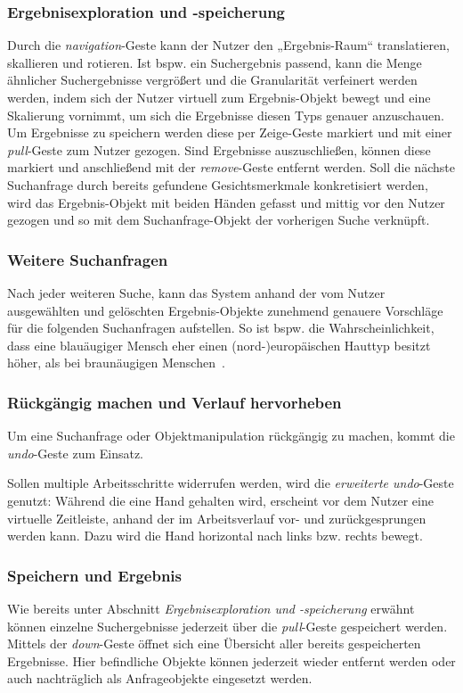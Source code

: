 \documentclass{sigchi-ext}
\begin{document}
\subsubsection{Ergebnisexploration und -speicherung}
Durch die \textit{navigation}-Geste kann der Nutzer den „Ergebnis-Raum“
translatieren, skallieren und rotieren. Ist bspw. ein Suchergebnis
passend, kann die Menge ähnlicher Suchergebnisse vergrößert und die
Granularität verfeinert werden werden, indem sich der Nutzer virtuell zum Ergebnis-Objekt bewegt und eine Skalierung vornimmt, um sich die Ergebnisse diesen Typs genauer anzuschauen.
Um Ergebnisse zu speichern werden diese per Zeige-Geste markiert und mit einer \textit{pull}-Geste zum Nutzer gezogen. Sind Ergebnisse auszuschließen, können diese markiert und anschließend mit der \textit{remove}-Geste entfernt werden.
Soll die nächste Suchanfrage durch bereits gefundene Gesichtsmerkmale konkretisiert werden, wird das Ergebnis-Objekt mit beiden Händen gefasst und mittig vor den Nutzer gezogen und so mit dem Suchanfrage-Objekt der vorherigen Suche verknüpft.

\subsubsection{Weitere Suchanfragen}
Nach jeder weiteren Suche, kann das System anhand der vom Nutzer
ausgewählten und gelöschten Ergebnis-Objekte zunehmend genauere
Vorschläge für die folgenden Suchanfragen aufstellen. 
So ist bspw. die Wahrscheinlichkeit, dass eine blauäugiger Mensch eher einen
(nord-)europäischen Hauttyp besitzt höher, als bei braunäugigen
Menschen~\cite{eyecolor:article}.

\subsubsection{Rückgängig machen und Verlauf hervorheben}
Um eine Suchanfrage oder Objektmanipulation rückgängig zu machen,
kommt die \textit{undo}-Geste zum Einsatz. 

Sollen multiple Arbeitsschritte
widerrufen werden, wird die \textit{erweiterte undo}-Geste genutzt: 
Während die eine Hand gehalten wird, erscheint vor dem Nutzer eine virtuelle
Zeitleiste, anhand der im Arbeitsverlauf vor- und zurückgesprungen
werden kann. Dazu wird die Hand horizontal nach links bzw. rechts
bewegt. 

\subsubsection{Speichern und Ergebnis}
Wie bereits unter Abschnitt \textit{Ergebnisexploration und -speicherung} erwähnt können einzelne Suchergebnisse jederzeit über die \textit{pull}-Geste gespeichert werden. Mittels der \textit{down}-Geste öffnet sich eine Übersicht aller bereits gespeicherten Ergebnisse. Hier befindliche Objekte können jederzeit wieder entfernt werden oder auch nachträglich als Anfrageobjekte eingesetzt werden.
\end{document}
